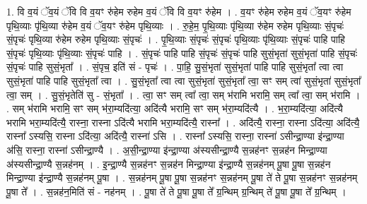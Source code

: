 \documentclass[17pt]{extarticle}
\begin{document}
1. वि व॒यं ॅव॒यं ॅवि वि व॒यꣳ रु॑हेम रुहेम व॒यं ॅवि वि व॒यꣳ रु॑हेम । . व॒यꣳ रु॑हेम रुहेम व॒यं ॅव॒यꣳ रु॑हेम पृथि॒व्याः पृ॑थि॒व्या रु॑हेम व॒यं ॅव॒यꣳ रु॑हेम पृथि॒व्याः । . रु॒हे॒म॒ पृ॒थि॒व्याः पृ॑थि॒व्या रु॑हेम रुहेम पृथि॒व्याः सं॒पृचः॑ सं॒पृचः॑ पृथि॒व्या रु॑हेम रुहेम पृथि॒व्याः सं॒पृचः॑ । . पृ॒थि॒व्याः सं॒पृचः॑ सं॒पृचः॑ पृथि॒व्याः पृ॑थि॒व्याः सं॒पृचः॑ पाहि पाहि सं॒पृचः॑ पृथि॒व्याः पृ॑थि॒व्याः सं॒पृचः॑ पाहि । . सं॒पृचः॑ पाहि पाहि सं॒पृचः॑ सं॒पृचः॑ पाहि सुसं॒भृता॑ सुसं॒भृता॑ पाहि सं॒पृचः॑ सं॒पृचः॑ पाहि सुसं॒भृता᳚ । . सं॒पृच॒ इति॑ सं - पृचः॑ । . पा॒हि॒ सु॒सं॒भृता॑ सुसं॒भृता॑ पाहि पाहि सुसं॒भृता᳚ त्वा त्वा सुसं॒भृता॑ पाहि पाहि सुसं॒भृता᳚ त्वा । . सु॒सं॒भृता᳚ त्वा त्वा सुसं॒भृता॑ सुसं॒भृता᳚ त्वा॒ सꣳ सम् त्वा॑ सुसं॒भृता॑ सुसं॒भृता᳚ त्वा॒ सम् । . सु॒सं॒भृतेति॑ सु - सं॒भृता᳚ । . त्वा॒ सꣳ सम् त्वा᳚ त्वा॒ सम् भ॑रामि भरामि॒ सम् त्वा᳚ त्वा॒ सम् भ॑रामि । . सम् भ॑रामि भरामि॒ सꣳ सम् भ॑रा॒म्यदि॑त्या॒ अदि॑त्यै भरामि॒ सꣳ सम् भ॑रा॒म्यदि॑त्यै । . भ॒रा॒म्यदि॑त्या॒ अदि॑त्यै भरामि भरा॒म्यदि॑त्यै॒ रास्ना॒ रास्ना ऽदि॑त्यै भरामि भरा॒म्यदि॑त्यै॒ रास्ना᳚ । . अदि॑त्यै॒ रास्ना॒ रास्ना ऽदि॑त्या॒ अदि॑त्यै॒ रास्ना᳚ ऽस्यसि॒ रास्ना ऽदि॑त्या॒ अदि॑त्यै॒ रास्ना॑ ऽसि । . रास्ना᳚ ऽस्यसि॒ रास्ना॒ रास्ना॑ ऽसीन्द्रा॒ण्या इ॑न्द्रा॒ण्या अ॑सि॒ रास्ना॒ रास्ना॑ ऽसीन्द्रा॒ण्यै । . अ॒सी॒न्द्रा॒ण्या इ॑न्द्रा॒ण्या अ॑स्यसीन्द्रा॒ण्यै स॒न्नह॑नꣳ स॒न्नह॑न मिन्द्रा॒ण्या अ॑स्यसीन्द्रा॒ण्यै स॒न्नह॑नम् । . इ॒न्द्रा॒ण्यै स॒न्नह॑नꣳ स॒न्नह॑न मिन्द्रा॒ण्या इ॑न्द्रा॒ण्यै स॒न्नह॑नम् पू॒षा पू॒षा स॒न्नह॑न मिन्द्रा॒ण्या इ॑न्द्रा॒ण्यै स॒न्नह॑नम् पू॒षा । . स॒न्नह॑नम् पू॒षा पू॒षा स॒न्नह॑नꣳ स॒न्नह॑नम् पू॒षा ते॑ ते पू॒षा स॒न्नह॑नꣳ स॒न्नह॑नम् पू॒षा ते᳚ । . स॒न्नह॑न॒मिति॑ सं - नह॑नम् । . पू॒षा ते॑ ते पू॒षा पू॒षा ते᳚ ग्र॒न्थिम् ग्र॒न्थिम् ते॑ पू॒षा पू॒षा ते᳚ ग्र॒न्थिम् । \newline
\end{document}
